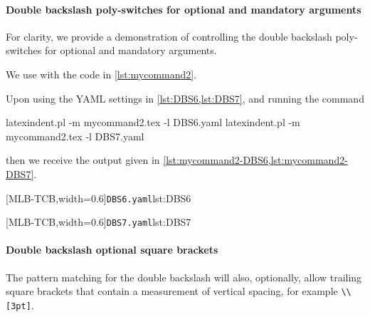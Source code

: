 \documentclass[10pt]{article}
\begin{document}
 \paragraph{Double backslash poly-switches for optional and mandatory arguments}
  For clarity, we provide a demonstration of controlling the double backslash
  poly-switches for optional and mandatory arguments.

  \begin{example}
  We use with the code in \cref{lst:mycommand2}. 


  Upon using the YAML settings in \cref{lst:DBS6,lst:DBS7}, and running the command
   

  \begin{commandshell}
latexindent.pl -m mycommand2.tex -l DBS6.yaml
latexindent.pl -m mycommand2.tex -l DBS7.yaml
\end{commandshell}

  then we receive the output given in \cref{lst:mycommand2-DBS6,lst:mycommand2-DBS7}.

  \begin{cmhtcbraster}[
    raster force size=false,
    raster column 1/.style={add to width=-.1\textwidth},
    raster column skip=.03\linewidth]
   [MLB-TCB,width=0.6\textwidth]{\texttt{DBS6.yaml}}{lst:DBS6}
  \end{cmhtcbraster}

  \begin{cmhtcbraster}[
    raster force size=false,
    raster column 1/.style={add to width=-.1\textwidth},
    raster column skip=.03\linewidth]
   [MLB-TCB,width=0.6\textwidth]{\texttt{DBS7.yaml}}{lst:DBS7}
  \end{cmhtcbraster}
  \end{example}

 \paragraph{Double backslash optional square brackets}
  The pattern matching for the double backslash will also, optionally, allow trailing
  square brackets that contain a measurement of vertical spacing, for example
  \lstinline!\\[3pt]!. 
\end{document}
